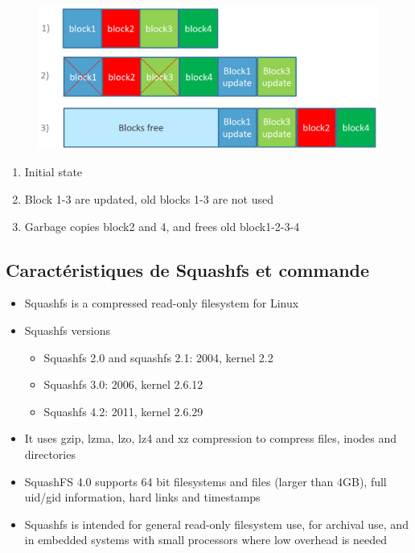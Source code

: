 \documentclass[resume]{subfiles}
\begin{document}
\begin{figure}[H]
    \centering
    \includegraphics[width=1\columnwidth]{Figures/fileSystem/log_fs.png}
    \label{fig:log_fs}
\end{figure}
\begin{enumerate}
    \item Initial state
    \item Block 1-3 are updated, old blocks 1-3 are not used
    \item Garbage copies block2 and 4, and frees old block1-2-3-4
\end{enumerate}

\subsection{Caractéristiques de Squashfs et commande}
\begin{itemize}
    \item Squashfs is a compressed read-only filesystem for Linux
    \item Squashfs versions
    \begin{itemize}
        \item Squashfs 2.0 and squashfs 2.1: 2004, kernel 2.2
        \item Squashfs 3.0: 2006, kernel 2.6.12
        \item Squashfs 4.2: 2011, kernel 2.6.29
    \end{itemize}
    \item It uses gzip, lzma, lzo, lz4 and xz compression to compress files, inodes and directories
    \item SquashFS 4.0 supports 64 bit filesystems and files (larger than 4GB), full uid/gid information, hard links and timestamps
    \item Squashfs is intended for general read-only filesystem use, for archival use, and in embedded systems with small processors where low overhead is needed
\end{itemize}
\end{document}
